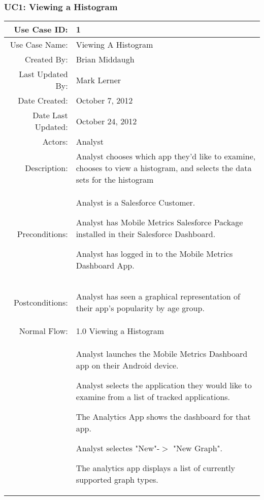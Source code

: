 \documentclass[12pt,oneside,letterpaper]{article}
\newenvironment{packed_enumerate}{ %
\vspace{-7mm}
\begin{enumerate}
  \setlength{\itemsep}{0pt}
  \setlength{\parskip}{0pt}
  \setlength{\parsep}{0pt}
}{\end{enumerate}
\vspace{-8mm}}
\begin{document}
\subsubsection{\label{Viewing A Historgram}UC1: Viewing a Histogram}
\begin{longtable}{|r|p{3.8in}|}
\hline
Use Case ID:&1\\
\hline
Use Case Name:&Viewing A Histogram\\
\hline
Created By:&Brian Middaugh\\
\hline
Last Updated By:&Mark Lerner\\
\hline
Date Created:&October 7, 2012\\
\hline
Date Last Updated:&October 24, 2012\\
\hline
Actors:&Analyst\\
\hline
Description:&Analyst chooses which app they'd like to examine, chooses to view a histogram, and selects the data sets for the histogram\\
\hline
Preconditions:& 
\begin{packed_enumerate}
\item Analyst is a Salesforce Customer.
\item Analyst has Mobile Metrics Salesforce Package installed in their Salesforce Dashboard.
\item Analyst has logged in to the Mobile Metrics Dashboard App.
\end{packed_enumerate}\\
\hline
Postconditions:&
\begin{packed_enumerate}
\item Analyst has seen a graphical representation of their app's popularity by age group.
\end{packed_enumerate}\\
\hline
Normal Flow:&1.0 Viewing a Histogram\\
&  %
\begin{packed_enumerate}
\item Analyst launches the Mobile Metrics Dashboard app on their Android device.
\item Analyst selects the application they would like to examine from a list of tracked applications.
\item The Analytics App shows the dashboard for that app.
\item Analyst selectes "New"-$>$ "New Graph".
\item The analytics app displays a list of currently supported graph types.

\end{packed_enumerate}
\end{longtable}
\end{document}
